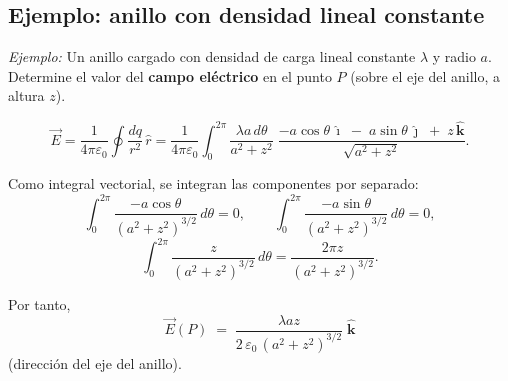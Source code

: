 \documentclass[a4paper,12pt]{article}
\begin{document}
\bigskip

\subsection*{Ejemplo: anillo con densidad lineal constante}

\noindent
\textit{Ejemplo:} Un anillo cargado con densidad de carga lineal constante $\lambda$ y radio $a$.  
Determine el valor del \textbf{campo eléctrico} en el punto $P$ (sobre el eje del anillo, a altura $z$).

\[
\vec E
= \frac{1}{4\pi\varepsilon_0}\oint \frac{dq}{r^2}\,\hat r
= \frac{1}{4\pi\varepsilon_0}\int_{0}^{2\pi}
   \frac{\lambda a\, d\theta}{a^{2}+z^{2}}\;
   \frac{-a\cos\theta\,\hat{\imath}\;-\;a\sin\theta\,\hat{\jmath}\;+\;z\,\hat{\mathbf k}}
        {\sqrt{a^{2}+z^{2}}}.
\]

Como integral vectorial, se integran las componentes por separado:
\[
\int_{0}^{2\pi} \frac{-a\cos\theta}{(a^{2}+z^{2})^{3/2}}\, d\theta = 0, \qquad
\int_{0}^{2\pi} \frac{-a\sin\theta}{(a^{2}+z^{2})^{3/2}}\, d\theta = 0,
\]
\[
\int_{0}^{2\pi} \frac{z}{(a^{2}+z^{2})^{3/2}}\, d\theta
= \frac{2\pi z}{(a^{2}+z^{2})^{3/2}}.
\]

Por tanto,
\[
\boxed{\;
\vec E(P) \;=\; \frac{\lambda a z}{2\,\varepsilon_0\,(a^{2}+z^{2})^{3/2}}\;\hat{\mathbf k}
\;}
\]
(dirección del eje del anillo).
\end{document}
